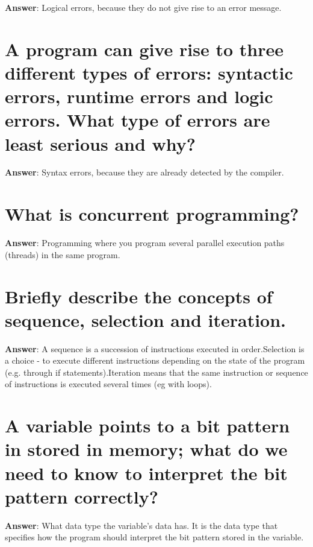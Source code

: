 \documentclass[a4paper,11pt,oneside]{book}
\begin{document}
\begin{sloppypar}
\label{q:202:sa:en:True}

\textbf{Answer}: Logical errors, because they do not give rise to an error message.



\section{A program can give rise to three different types of errors: syntactic errors, runtime errors and logic errors. What type of errors are least serious and why?}

\label{q:203:sa:en:True}

\textbf{Answer}: Syntax errors, because they are already detected by the compiler.



\section{What is concurrent programming?}

\label{q:204:sa:en:True}

\textbf{Answer}: Programming where you program several parallel execution paths (threads) in the same program.



\section{Briefly describe the concepts of sequence, selection and iteration.}

\label{q:205:sa:en:True}

\textbf{Answer}: A sequence is a succession of instructions executed in order.Selection is a choice - to execute different instructions depending on the state of the program (e.g. through if statements).Iteration means that the same instruction or sequence of instructions is executed several times (eg with loops).



\section{A variable points to a bit pattern in stored in memory; what do we need to know to interpret the bit pattern correctly?}

\label{q:206:sa:en:True}

\textbf{Answer}: What data type the variable's data has. It is the data type that specifies how the program should interpret the bit pattern stored in the variable.




\end{sloppypar}
\end{document}
